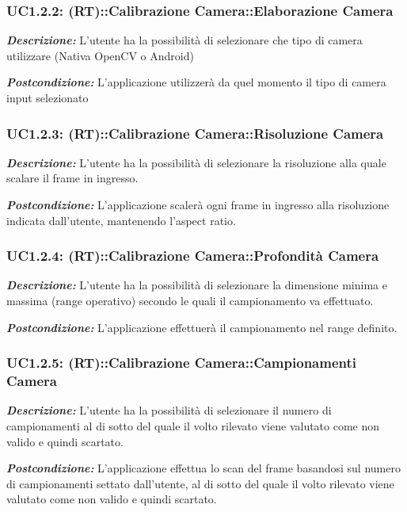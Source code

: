 \subsubsection{UC1.2.2: (RT)::Calibrazione Camera::Elaborazione Camera}

\textbf{\textit{Descrizione:}} L'utente ha la possibilità di selezionare che tipo di camera utilizzare (Nativa OpenCV o Android) 

\textbf{\textit{Postcondizione:}} L'applicazione utilizzerà da quel momento il tipo di camera input selezionato

\subsubsection{UC1.2.3: (RT)::Calibrazione Camera::Risoluzione Camera}

\textbf{\textit{Descrizione:}} L'utente ha la possibilità di selezionare la risoluzione alla quale scalare il frame in ingresso.

\textbf{\textit{Postcondizione:}} L'applicazione scalerà ogni frame in ingresso alla risoluzione indicata dall'utente, mantenendo l'aspect ratio.

\subsubsection{UC1.2.4: (RT)::Calibrazione Camera::Profondità Camera}

\textbf{\textit{Descrizione:}}  L'utente ha la possibilità di selezionare la dimensione minima e massima (range operativo) secondo le quali il campionamento va effettuato.

\textbf{\textit{Postcondizione:}} L'applicazione effettuerà il campionamento nel range definito.

\subsubsection{UC1.2.5: (RT)::Calibrazione Camera::Campionamenti Camera}

\textbf{\textit{Descrizione:}} L'utente ha la possibilità di selezionare il numero di campionamenti al di sotto del quale il volto rilevato viene valutato come non valido e quindi scartato.

\textbf{\textit{Postcondizione:}} L'applicazione effettua lo scan del frame basandosi sul numero di campionamenti settato dall'utente, al di sotto del quale il volto rilevato viene valutato come non valido e quindi scartato. 

